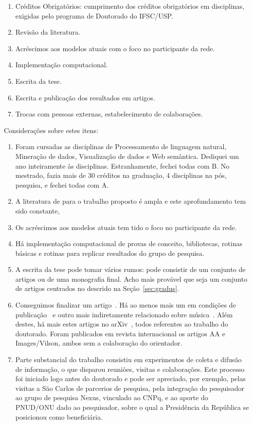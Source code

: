 \documentclass[a4paper,openright,12pt]{report} %
\begin{document}
\begin{enumerate}
\item Créditos Obrigatórios: cumprimento dos créditos obrigatórios em disciplinas, exigidas pelo programa de Doutorado do IFSC/USP.

\item Revisão da literatura.

\item Acréscimos aos modelos atuais com o foco no participante da rede.

\item Implementação computacional.

\item Escrita da tese.

\item Escrita e publicação dos resultados em artigos.

\item Trocas com pessoas externas, estabelecimento de colaborações.
\end{enumerate}

Considerações sobre estes itens:
\begin{enumerate}
\item Foram cursadas as disciplinas de Processamento de linguagem natural, Mineração de dados, Visualização de dados e Web semântica. Dediquei um ano inteiramente às disciplinas. Estranhamente, fechei todas com B. No mestrado, fazia mais de 30 créditos na graduação, 4 disciplinas na pós, pesquisa, e fechei todas com A.
\item A literatura de para o trabalho proposto é ampla e este aprofundamento tem sido constante,
\item Os acréscimos aos modelos atuais tem tido o foco no participante da rede.
\item Há implementação computacional de provas de conceito, bibliotecas, rotinas básicas e rotinas para replicar resultados do grupo de pesquisa.

\item A escrita da tese pode tomar vários rumos: pode consistir de um conjunto de artigos ou de uma monografia final. Acho mais provável que seja um conjunto de artigos centrados no descrido na Seção~\ref{sec:gradus}.
\item Conseguimos finalizar um artigo~\cite{timeS}. Há ao menos mais um em condições de publicação~\cite{ops} e outro mais indiretamente relacionado sobre música~\cite{mass}. Além destes, há mais estes artigos no arXiv~\cite{ensaio,connectiveDiff,XXX,YY}, todos referentes ao trabalho do doutorado. Foram publicados em revista internacional os artigos AA e Images/Vilson, ambos sem a colaboração do orientador.
\item Parte substancial do trabalho consistiu em experimentos de coleta e difusão de informação, o que disparou reuniões, visitas e colaborações. Este processo foi iniciado logo antes do doutorado e pode ser apreciado, por exemplo, pelas visitas a São Carlos de parcerios de pesquisa, pela integração do pesquisador ao grupo de pesquisa Nexus, vinculado ao CNPq, e ao aporte do PNUD/ONU dado ao pesquisador, sobre o qual a Presidência da República se posicionou como beneficiária.
\end{enumerate}
\end{document}
